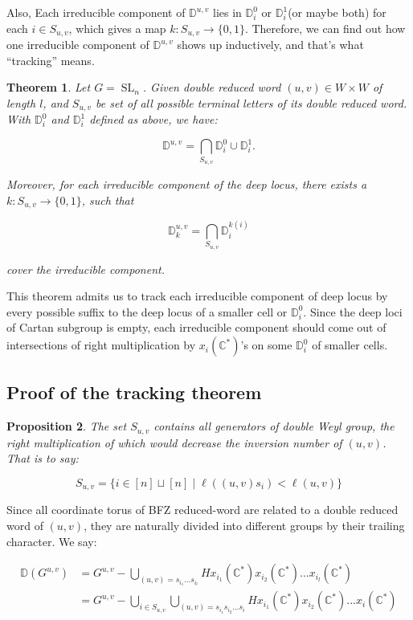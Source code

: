 \documentclass[12pt]{amsart}
\newcommand{\C}{\mathbb C}
\newcommand{\D}{\mathbb D}
\newcommand{\SL}{\operatorname{SL}}
\theoremstyle{plain}
\newtheorem{theorem}{Theorem}[section]
\newtheorem{proposition}[theorem]{Proposition}
\theoremstyle{definition}
\theoremstyle{remark}
\begin{document}
\medskip

Also, Each irreducible component of $\D^{u,v}$ lies in $\D^{0}_i$ or $\D^{1}_i$(or maybe both) for each $i\in S_{u,v}$, which gives a map $k: S_{u,v} \to \{0,1\}$. Therefore, we can find out how one irreducible component of $\D^{u,v}$ shows up inductively, and that's what ``tracking'' means.

\begin{theorem}

Let $G=\SL_n$. Given double reduced word $(u,v)\in W\times W$ of length $l$, and $S_{u,v}$ be set of all possible terminal letters of its double reduced word. With $\D_i^{0}$ and $\D_i^{1}$ defined as above, we have:

\[
\D^{u,v}=\bigcap_{S_{u,v}} \D^{0}_i\cup \D^{1}_i.
\]

Moreover, for each irreducible component of the deep locus, there exists a $k: S_{u,v} \to \{0,1\}$, such that

\[
\D^{u,v}_k=\bigcap_{S_{u,v}} \D^{k(i)}_i
\]

cover the irreducible component.
\end{theorem}

This theorem admits us to track each irreducible component of deep locus by every possible suffix to the deep locus of a smaller cell or $\D^{0}_i$. Since the deep loci of Cartan subgroup is empty, each irreducible component should come out of intersections of right multiplication by $x_i(\C^*)$'s on some $\D^{0}_i$ of smaller cells.

\subsection{Proof of the tracking theorem}

\begin{proposition}

The set $S_{u,v}$ contains all generators of double Weyl group, the right multiplication of which would decrease the inversion number of $(u,v)$. That is to say:

\[
S_{u,v}=\{i\in [n]\sqcup [n]\; |\; \ell((u,v)s_i)<\ell (u,v)\}
\]
\end{proposition}


Since all coordinate torus of BFZ reduced-word are related to a double reduced word of $(u,v)$, they are naturally divided into different groups by their trailing character. We say:

\[
\begin{aligned}
\D(G^{u,v})&=G^{u,v}-\bigcup_{(u,v)=s_{i_1}...s_{i_l}}Hx_{i_1}(\C^*)x_{i_2}(\C^*)...x_{i_l}(\C^*)\\
&=G^{u,v}-\bigcup_{i\in S_{u,v}}\bigcup_{(u,v)=s_{i_1}s_{i_2}...s_{i}}Hx_{i_1}(\C^*)x_{i_2}(\C^*)...x_{i}(\C^*)
\end{aligned}
\]
\end{document}
